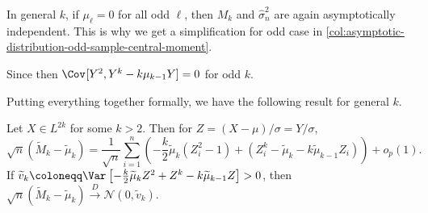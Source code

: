 \begin{remark}
	In general \(k\), if \(\mu _{\ell } = 0\) for all odd \(\ell \), then \(M_k\) and \(\hat{\sigma} _n^2\) are again asymptotically independent. This is why we get a simplification for odd case in \autoref{col:asymptotic-distribution-odd-sample-central-moment}.
\end{remark}
\begin{explanation}
	Since then \(\Cov_{}[Y^2 , Y^k - k \mu _{k-1} Y] = 0\) for odd \(k\).
\end{explanation}

Putting everything together formally, we have the following result for general \(k\).

\begin{theorem}\label{thm:asymptotic-distribution-sample-standardized-central-moment}
	Let \(X \in L^{2k}\) for some \(k > 2\). Then for \(Z = (X - \mu ) / \sigma = Y / \sigma \),
	\[
		\sqrt{n} (\widetilde{M} _k - \widetilde{\mu} _k)
		= \frac{1}{\sqrt{n} } \sum_{i=1}^{n} \left( -\frac{k}{2} \widetilde{\mu} _k (Z_i^2 - 1) + (Z_i^k - \widetilde{\mu} _k - k \widetilde{\mu} _{k-1} Z_i ) \right) + o_p(1).
	\]
	If \(\widetilde{v} _k \coloneqq \Var_{}\left[-\frac{k}{2} \widetilde{\mu} _k Z^2 + Z^k - k \widetilde{\mu} _{k-1} Z \right] > 0\), then \(\sqrt{n} (\widetilde{M} _k - \widetilde{\mu} _k) \overset{D}{\to} \mathcal{N} (0, \widetilde{v} _k)\).
\end{theorem}
